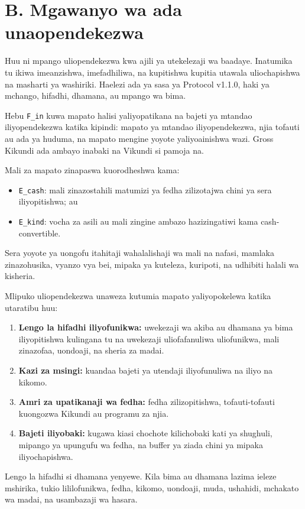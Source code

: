 \documentclass[11pt]{article}
\begin{document}
\section*{B. Mgawanyo wa ada unaopendekezwa}

Huu ni mpango uliopendekezwa kwa ajili ya utekelezaji wa baadaye. Inatumika tu ikiwa imeanzishwa, imefadhiliwa, na kupitishwa kupitia utawala uliochapishwa na masharti ya washiriki. Haelezi ada ya sasa ya Protocol v1.1.0, haki ya mchango, hifadhi, dhamana, au mpango wa bima.

Hebu \texttt{F\_in} kuwa mapato halisi yaliyopatikana na bajeti ya mtandao iliyopendekezwa katika kipindi: mapato ya mtandao iliyopendekezwa, njia tofauti au ada ya huduma, na mapato mengine yoyote yaliyoainishwa wazi. Gross Kikundi ada ambayo inabaki na Vikundi si pamoja na.

Mali za mapato zinapaswa kuorodheshwa kama:

\begin{itemize}[leftmargin=*]
\item \texttt{E\_cash}: mali zinazostahili matumizi ya fedha zilizotajwa chini ya sera iliyopitishwa; au
\item \texttt{E\_kind}: vocha za asili au mali zingine ambazo hazizingatiwi kama cash-convertible.
\end{itemize}
Sera yoyote ya uongofu itahitaji wahalalishaji wa mali na nafasi, mamlaka zinazohusika, vyanzo vya bei, mipaka ya kuteleza, kuripoti, na udhibiti halali wa kisheria.

Mlipuko uliopendekezwa unaweza kutumia mapato yaliyopokelewa katika utaratibu huu:

\begin{enumerate}[leftmargin=*]
\item \textbf{Lengo la hifadhi iliyofunikwa:} uwekezaji wa akiba au dhamana ya bima iliyopitishwa kulingana tu na uwekezaji uliofafanuliwa uliofunikwa, mali zinazofaa, uondoaji, na sheria za madai.
\item \textbf{Kazi za msingi:} kuandaa bajeti ya utendaji iliyofunuliwa na iliyo na kikomo.
\item \textbf{Amri za upatikanaji wa fedha:} fedha zilizopitishwa, tofauti-tofauti kuongozwa Kikundi au programu za njia.
\item \textbf{Bajeti iliyobaki:} kugawa kiasi chochote kilichobaki kati ya shughuli, mipango ya upungufu wa fedha, na buffer ya ziada chini ya mipaka iliyochapishwa.
\end{enumerate}
Lengo la hifadhi si dhamana yenyewe. Kila bima au dhamana lazima ieleze mshirika, tukio lililofunikwa, fedha, kikomo, uondoaji, muda, ushahidi, mchakato wa madai, na usambazaji wa hasara.
\end{document}
